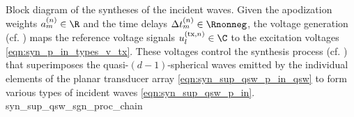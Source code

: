 %
{%
 Block diagram of
 the syntheses of
 the incident waves.
 Given
 the apodization weights
 $a_{m}^{(n)} \in \R$ and
 the time delays
 $\Delta t_{m}^{(n)} \in \Rnonneg$,
 the voltage generation
 (cf. ) maps
 the reference voltage signals
 $u_{l}^{(\text{tx}, n)} \in \C$ to
 the excitation voltages
 \eqref{eqn:syn_p_in_types_v_tx}.
 These voltages control
 the synthesis process
 (cf. ) that superimposes
 the quasi-$(d-1)$-spherical waves emitted by
 the individual elements of
 the planar transducer array
 \eqref{eqn:syn_sup_qsw_p_in_qsw} to form
 various types of
 incident waves
 \eqref{eqn:syn_sup_qsw_p_in}.
}%
{syn_sup_qsw_sgn_proc_chain}

